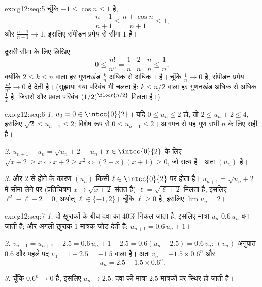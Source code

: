 \begin{solution}{exo:g12:seq:5}
चूँकि $-1 \leq \cos n \leq 1$ है,
\[
\frac{n-1}{n+1} \leq \frac{n + \cos n}{n+1} \leq 1,
\]
और $\frac{n-1}{n+1} \to 1$, इसलिए संपीडन प्रमेय से सीमा $1$ है।

दूसरी सीमा के लिए लिखिए
\[
0 \leq \frac{n!}{n^n}
= \frac{1}{n}\cdot\frac{2}{n}\cdots\frac{n}{n}
\leq \frac{1}{n},
\]
क्योंकि $2 \leq k \leq n$ वाला हर गुणनखंड $\frac{k}{n}$ अधिक से अधिक $1$ है। चूँकि $\frac1n \to 0$ है, संपीडन
प्रमेय $\frac{n!}{n^n} \to 0$ दे देती है। (सुझाया गया  परिबंध भी चलता है: $k \leq n/2$ वाला हर
गुणनखंड अधिक से अधिक $\frac12$ है, जिससे और प्रबल परिबंध $(1/2)^{\floor{n/2}}$ मिलता है।)
\end{solution}

\begin{solution}{exo:g12:seq:6}
\emph{1.} $u_0 = 0 \in \intcc{0}{2}$। यदि $0 \leq u_n \leq 2$ हो, तो $2 \leq u_n + 2 \leq 4$, इसलिए $\sqrt{2} \leq u_{n+1} \leq 2$; विशेष रूप से $0 \leq u_{n+1} \leq 2$। आगमन से
यह गुण सभी $n$ के लिए सही है।

\emph{2.} $u_{n+1} - u_n = \sqrt{u_n + 2} - u_n$। $x \in \intcc{0}{2}$ के लिए $\sqrt{x+2} \geq x \iff x + 2 \geq x^2 \iff (2-x)(x+1) \geq 0$, जो सत्य है। अतः $(u_n)$  है।

\emph{3.}  और $2$ से  होने के कारण $(u_n)$ किसी $\ell \in \intcc{0}{2}$ पर
 होता है। $u_{n+1} = \sqrt{u_n + 2}$ में सीमा लेने पर (प्रतिचित्रण $x \mapsto \sqrt{x+2}$ संतत है) $\ell = \sqrt{\ell + 2}$ मिलता
है, इसलिए $\ell^2 - \ell - 2 = 0$, अर्थात् $\ell \in \{-1, 2\}$। चूँकि $\ell \geq 0$ है, इसलिए $\lim u_n = 2$।
\end{solution}

\begin{solution}{exo:g12:seq:7}
\emph{1.} दो ख़ुराकों के बीच दवा का $40\%$ निकल जाता है, इसलिए मात्रा $u_n$ $0.6\,u_n$
बन जाती है; और अगली ख़ुराक $1$ मात्रक जोड़ देती है: $u_{n+1} = 0.6\,u_n + 1$।

\emph{2.} $v_{n+1} = u_{n+1} - 2.5 = 0.6\,u_n + 1 - 2.5 = 0.6(u_n - 2.5)
= 0.6\,v_n$: $(v_n)$ अनुपात $0.6$ और पहले पद $v_0 = 1 - 2.5 = -1.5$ वाला  है।
अतः $v_n = -1.5 \times 0.6^n$ और
\[
u_n = 2.5 - 1.5 \times 0.6^n .
\]

\emph{3.} चूँकि $0.6^n \to 0$ है, इसलिए $u_n \to 2.5$: दवा की मात्रा $2.5$ मात्रकों पर स्थिर हो
जाती है।
\end{solution}

